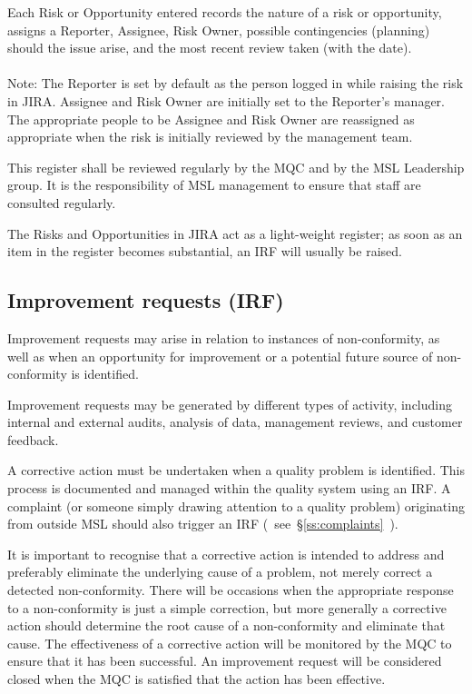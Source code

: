 Each Risk or Opportunity entered records the nature of a risk or opportunity, assigns a Reporter, Assignee, Risk Owner, possible contingencies (planning) should the issue arise, and the most recent review taken (with the date). \\
\\
Note: The Reporter is set by default as the person logged in while raising the risk in JIRA. Assignee and Risk Owner are initially set to the Reporter's manager.  The appropriate people to be Assignee and Risk Owner are reassigned as appropriate when the risk is initially reviewed by the management team.

This register shall be reviewed regularly by the MQC and by the MSL Leadership group. It is the responsibility of MSL management to ensure that staff are consulted regularly. 

The Risks and Opportunities in JIRA act as a light-weight register; as soon as an item in the register becomes substantial, an IRF will usually be raised.

\subsection{Improvement requests (IRF)}
\label{ss:improvement_requests}
Improvement requests may arise in relation to instances of non-conformity, as well as when an opportunity for improvement or a potential future source of non-conformity is identified. 

Improvement requests may be generated by different types of activity, including internal and external audits, analysis of data, management reviews, and customer feedback. 

A corrective action must be undertaken when a quality problem is identified. This process is documented and managed within the quality system using an IRF. A complaint (or someone simply drawing attention to a quality problem) originating from outside MSL should also trigger an IRF (~see~\S\ref{ss:complaints}~).

It is important to recognise that a corrective action is intended to address and preferably eliminate the underlying cause of a problem, not merely correct a detected non-conformity. There will be occasions when the appropriate response to a non-conformity is just a simple correction, but more generally a corrective action should determine the root cause of a non-conformity and eliminate that cause. The effectiveness of a corrective action will be monitored by the MQC to ensure that it has been successful.  An improvement request will be considered closed when the MQC is satisfied that the action has been effective.

